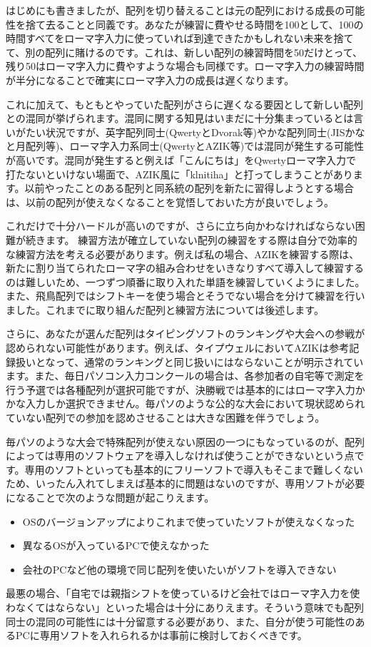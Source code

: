 はじめにも書きましたが、配列を切り替えることは元の配列における成長の可能性を捨て去ることと同義です。あなたが練習に費やせる時間を100として、100の時間すべてをローマ字入力に使っていれば到達できたかもしれない未来を捨てて、別の配列に賭けるのです。これは、新しい配列の練習時間を50だけとって、残り50はローマ字入力に費やすような場合も同様です。ローマ字入力の練習時間が半分になることで確実にローマ字入力の成長は遅くなります。

これに加えて、もともとやっていた配列がさらに遅くなる要因として新しい配列との混同が挙げられます。混同に関する知見はいまだに十分集まっているとは言いがたい状況ですが、英字配列同士(QwertyとDvorak等)やかな配列同士(JISかなと月配列等)、ローマ字入力系同士(QwertyとAZIK等)では混同が発生する可能性が高いです。混同が発生すると例えば「こんにちは」をQwertyローマ字入力で打たないといけない場面で、AZIK風に「klnitiha」と打ってしまうことがあります。以前やったことのある配列と同系統の配列を新たに習得しようとする場合は、以前の配列が使えなくなることを覚悟しておいた方が良いでしょう。

これだけで十分ハードルが高いのですが、さらに立ち向かわなければならない困難が続きます。
練習方法が確立していない配列の練習をする際は自分で効率的な練習方法を考える必要があります。例えば私の場合、AZIKを練習する際は、新たに割り当てられたローマ字の組み合わせをいきなりすべて導入して練習するのは難しいため、一つずつ順番に取り入れた単語を練習していくようにました。また、飛鳥配列ではシフトキーを使う場合とそうでない場合を分けて練習を行いました。これまでに取り組んだ配列と練習方法については後述します。

さらに、あなたが選んだ配列はタイピングソフトのランキングや大会への参戦が認められない可能性があります。例えば、タイプウェルにおいてAZIKは参考記録扱いとなって、通常のランキングと同じ扱いにはならないことが明示されています。また、毎日パソコン入力コンクールの場合は、各参加者の自宅等で測定を行う予選では各種配列が選択可能ですが、決勝戦では基本的にはローマ字入力かかな入力しか選択できません。毎パソのような公的な大会において現状認められていない配列での参加を認めさせることは大きな困難を伴うでしょう。

毎パソのような大会で特殊配列が使えない原因の一つにもなっているのが、配列によっては専用のソフトウェアを導入しなければ使うことができないという点です。専用のソフトといっても基本的にフリーソフトで導入もそこまで難しくないため、いったん入れてしまえば基本的に問題はないのですが、専用ソフトが必要になることで次のような問題が起こりえます。
\begin{itemize}
 \item OSのバージョンアップによりこれまで使っていたソフトが使えなくなった
 \item 異なるOSが入っているPCで使えなかった
 \item 会社のPCなど他の環境で同じ配列を使いたいがソフトを導入できない
\end{itemize}
最悪の場合、「自宅では親指シフトを使っているけど会社ではローマ字入力を使わなくてはならない」といった場合は十分にありえます。そういう意味でも配列同士の混同の可能性には十分留意する必要があり、また、自分が使う可能性のあるPCに専用ソフトを入れられるかは事前に検討しておくべきです。


